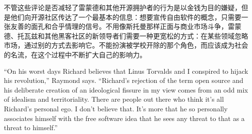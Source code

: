 \ifdefined\chs
不管这些评论是否减轻了雷蒙德和其他开源拥护者的行为是以金钱为目的嫌疑，但是他们向开源社区传达了一个最基本的信息：想要宣传自由软件的概念，只需要一张友善的面孔和合乎情理的信号。不用像斯托曼那样正面与商业市场斗争，雷蒙德、托瓦兹和其他黑客社区的新领导者们需要一种更宽松的方式：在某些领域忽略市场，通过别的方式去影响它。不能扮演被学校开除的那个角色，而应该成为社会的名流，在这个过程中不断扩大自己的影响力。
\fi





\ifdefined\eng
``On his worst days Richard believes that Linus Torvalds and I conspired to hijack his revolution,'' Raymond says. ``Richard's rejection of the term open source and his deliberate creation of an ideological fissure in my view comes from an odd mix of idealism and territoriality. There are people out there who think it's all Richard's personal ego. I don't believe that. It's more that he so personally associates himself with the free software idea that he sees any threat to that as a threat to himself.''
\fi

